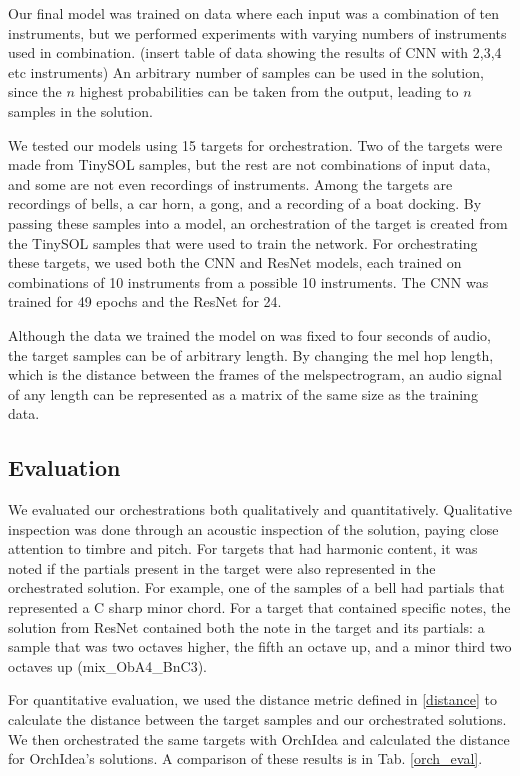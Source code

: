 \documentclass{article}
\begin{document}
Our final model was trained on data where each input was a combination of ten instruments, but we performed experiments with varying numbers of instruments used in combination. (insert table of data showing the results of CNN with 2,3,4 etc instruments) An arbitrary number of samples can be used in the solution, since the $n$ highest probabilities can be taken from the output, leading to $n$ samples in the solution.

We tested our models using 15 targets for orchestration. Two of the targets were made from TinySOL samples, but the rest are not combinations of input data, and some are not even recordings of instruments. Among the targets are recordings of bells, a car horn, a gong, and a recording of a boat docking. By passing these samples into a model, an orchestration of the target is created from the TinySOL samples that were used to train the network. For orchestrating these targets, we used both the CNN and ResNet models, each trained on combinations of 10 instruments from a possible 10 instruments. The CNN was trained for 49 epochs and the ResNet for 24.

Although the data we trained the model on was fixed to four seconds of audio, the target samples can be of arbitrary length. By changing the mel hop length, which is the distance between the frames of the melspectrogram, an audio signal of any length can be represented as a matrix of the same size as the training data.

\subsection{Evaluation}

We evaluated our orchestrations both qualitatively and quantitatively. Qualitative inspection was done through an acoustic inspection of the solution, paying close attention to timbre and pitch. For targets that had harmonic content, it was noted if the partials present in the target were also represented in the orchestrated solution. For example, one of the samples of a bell had partials that represented a C sharp minor chord. For a target that contained specific notes, the solution from ResNet contained both the note in the target and its partials: a sample that was two octaves higher, the fifth an octave up, and a minor third two octaves up (mix\_ObA4\_BnC3).


For quantitative evaluation, we used the distance metric defined in \eqref{distance} to calculate the distance between the target samples and our orchestrated solutions. We then orchestrated the same targets with OrchIdea and calculated the distance for OrchIdea's solutions. A comparison of these results is in Tab. \ref{orch_eval}.
\end{document}
